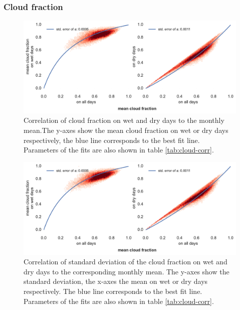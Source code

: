 \begin{refsection}
\subsubsection{Cloud fraction}
\begin{figure}
	\includegraphics[width=12cm]{figures/cloud.pdf}
	\caption[Correlation of cloud fraction on wet and dry days to the monthly mean]{Correlation of cloud fraction on wet and dry days to the monthly mean.The y-axes show the mean cloud fraction on wet or dry days respectively, the blue line corresponds to the best fit line. Parameters of the fits are also shown in table \ref{tab:cloud-corr}.}
	\label{fig:cloud}
\end{figure}
\begin{figure}
	\includegraphics[width=12cm, page=2]{figures/cloud.pdf}
	\caption[Correlation of standard deviation of cloud fraction to the monthly mean]{Correlation of standard deviation of the cloud fraction on wet and dry days to the corresponding monthly mean. The y-axes show the standard deviation, the x-axes the mean on wet or dry days respectively. The blue line corresponds to the best fit line. Parameters of the fits are also shown in table \ref{tab:cloud-corr}.}
	\label{fig:cloud_sd}
\end{figure}
\begin{table}[t]
	\caption[Fit results of cloud correlation for wet and dry days.]{Fit results of cloud correlation for wet and dry days for figure \ref{fig:cloud}}
	\label{tab:cloud-corr}
	
\end{table}


\end{refsection}

